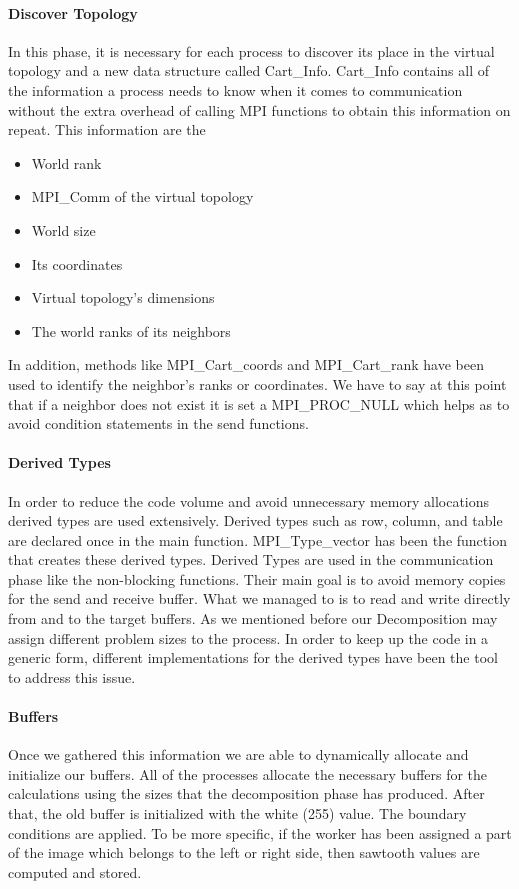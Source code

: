 \documentclass[12pt,a4paper]{article}
\begin{document}
      \paragraph{Discover Topology}
        In this phase, it is necessary for each process to discover its place in the virtual topology and a new data structure called Cart\_Info. Cart\_Info contains all of the information a process needs to know when it comes to communication without the extra overhead of calling MPI functions to obtain this information on repeat. This information are the

      \begin{itemize}
			  \item World rank
			  \item MPI\_Comm of the virtual topology
			  \item World size
			  \item Its coordinates
			  \item Virtual topology's dimensions
			  \item The world ranks of its neighbors
			\end{itemize}

			In addition, methods like MPI\_Cart\_coords and MPI\_Cart\_rank have been used to identify the neighbor's ranks or coordinates. We have to say at this point that if a neighbor does not exist it is set a MPI\_PROC\_NULL which helps as to avoid condition statements in the send functions.

        \paragraph{Derived Types}
            In order to reduce the code volume and avoid unnecessary memory allocations derived types are used extensively. Derived types such as row, column, and table are declared once in the main function. MPI\_Type\_vector has been the function that creates these derived types. Derived Types are used in the communication phase like the non-blocking functions. Their main goal is to avoid memory copies for the send and receive buffer. What we managed to is to read and write directly from and to the target buffers. As we mentioned before our Decomposition may assign different problem sizes to the process. In order to keep up the code in a generic form, different implementations for the derived types have been the tool to address this issue.

        \paragraph{Buffers}
			Once we gathered this information we are able to dynamically allocate and initialize our buffers. All of the processes allocate the necessary buffers for the calculations using the sizes that the decomposition phase has produced. After that, the old buffer is initialized with the white (255) value. The boundary conditions are applied. To be more specific, if the worker has been assigned a part of the image which belongs to the left or right side, then sawtooth values are computed and stored.
\end{document}
